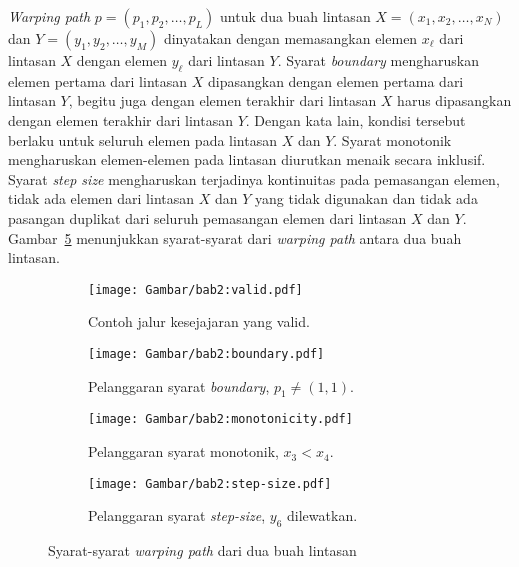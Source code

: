 \textit{Warping path} $p = (p_1, p_2, \ldots, p_L)$ untuk dua buah lintasan $X = (x_1, x_2, \ldots, x_N)$ dan $Y = (y_1, y_2, \ldots, y_M)$ dinyatakan dengan memasangkan elemen $x_\ell$ dari lintasan $X$ dengan elemen $y_\ell$ dari lintasan $Y$. Syarat \textit{boundary} mengharuskan elemen pertama dari lintasan $X$ dipasangkan dengan elemen pertama dari lintasan $Y$, begitu juga dengan elemen terakhir dari lintasan $X$ harus dipasangkan dengan elemen terakhir dari lintasan $Y$. Dengan kata lain, kondisi tersebut berlaku untuk seluruh elemen pada lintasan $X$ dan $Y$. Syarat monotonik mengharuskan elemen-elemen pada lintasan diurutkan menaik secara inklusif. Syarat \textit{step size} mengharuskan terjadinya kontinuitas pada pemasangan elemen, tidak ada elemen dari lintasan $X$ dan $Y$ yang tidak digunakan dan tidak ada pasangan duplikat dari seluruh pemasangan elemen dari lintasan $X$ dan $Y$. Gambar~\ref{bab2:dtw-requirements} menunjukkan syarat-syarat dari \textit{warping path} antara dua buah lintasan.

\begin{figure}[htbp]
    \centering
    \begin{subfigure}[htbp]{0.22\textwidth}
        \centering
        \texttt{[image: Gambar/bab2:valid.pdf]}
        \caption{Contoh jalur kesejajaran yang valid.}
        \label{bab2:valid}
    \end{subfigure} \hspace{2.5pt}
    \begin{subfigure}[htbp]{0.22\textwidth}
        \centering
        \texttt{[image: Gambar/bab2:boundary.pdf]}
        \caption{Pelanggaran syarat \textit{boundary}, $p_1 \neq (1, 1)$.}
        \label{bab2:boundary}
    \end{subfigure} \hspace{2.5pt}
    \begin{subfigure}[htbp]{0.22\textwidth}
        \centering
        \texttt{[image: Gambar/bab2:monotonicity.pdf]}
        \caption{Pelanggaran syarat monotonik, $x_3 < x_4$.}
        \label{bab2:monotonicity}
    \end{subfigure} \hspace{2.5pt}
    \begin{subfigure}[htbp]{0.22\textwidth}
        \centering
        \texttt{[image: Gambar/bab2:step-size.pdf]}
        \caption{Pelanggaran syarat \textit{step-size}, $y_6$ dilewatkan.}
        \label{bab2:step-size}
    \end{subfigure}
    \caption[Syarat-syarat \textit{warping path}]{Syarat-syarat \textit{warping path} dari dua buah lintasan}
    \label{bab2:dtw-requirements}
\end{figure}

